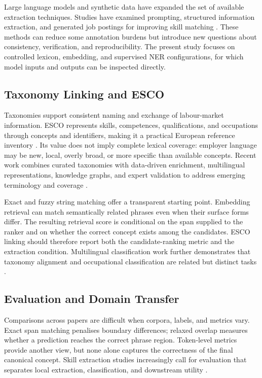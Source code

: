\documentclass[conference]{IEEEtran}
\begin{document}
Large language models and synthetic data have expanded the set of available extraction techniques. Studies have examined prompting, structured information extraction, and generated job postings for improving skill matching \cite{Nguyen2024,Howison2025,JobSkape2024}. These methods can reduce some annotation burdens but introduce new questions about consistency, verification, and reproducibility. The present study focuses on controlled lexicon, embedding, and supervised NER configurations, for which model inputs and outputs can be inspected directly.

\subsection{Taxonomy Linking and ESCO}
Taxonomies support consistent naming and exchange of labour-market information. ESCO represents skills, competences, qualifications, and occupations through concepts and identifiers, making it a practical European reference inventory \cite{ESCOPortal,ESCOClassification}. Its value does not imply complete lexical coverage: employer language may be new, local, overly broad, or more specific than available concepts. Recent work combines curated taxonomies with data-driven enrichment, multilingual representations, knowledge graphs, and expert validation to address emerging terminology and coverage \cite{Sleeman2018,ESCOXLMR2023,Kavas2025,DeSanto2026}.

Exact and fuzzy string matching offer a transparent starting point. Embedding retrieval can match semantically related phrases even when their surface forms differ. The resulting retrieval score is conditional on the span supplied to the ranker and on whether the correct concept exists among the candidates. ESCO linking should therefore report both the candidate-ranking metric and the extraction condition. Multilingual classification work further demonstrates that taxonomy alignment and occupational classification are related but distinct tasks \cite{Kavas2024,Gnehm2025}.

\subsection{Evaluation and Domain Transfer}
Comparisons across papers are difficult when corpora, labels, and metrics vary. Exact span matching penalises boundary differences; relaxed overlap measures whether a prediction reaches the correct phrase region. Token-level metrics provide another view, but none alone captures the correctness of the final canonical concept. Skill extraction studies increasingly call for evaluation that separates local extraction, classification, and downstream utility \cite{Senger2024,SkillSpan2022}.
\end{document}

